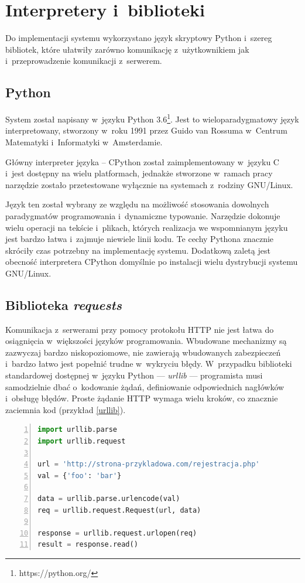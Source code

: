 \documentclass[12pt,a4paper,polish,thesis]{dcsbook}
\begin{document}
\section{Interpretery i~biblioteki}
Do implementacji systemu wykorzystano język skryptowy Python i~szereg bibliotek, które ułatwiły zarówno komunikację z~użytkownikiem jak i~przeprowadzenie komunikacji z~serwerem.

\subsection{Python}
System został napisany w~języku Python 3.6\footnote{https://python.org/}. Jest to wieloparadygmatowy język interpretowany, stworzony w~roku 1991 przez Guido van Rossuma w~Centrum Matematyki i~Informatyki w~Amsterdamie.

Główny interpreter języka -- CPython został zaimplementowany w~języku C i~jest dostępny na wielu platformach, jednakże stworzone w~ramach pracy narzędzie zostało przetestowane wyłącznie na systemach z~rodziny GNU/Linux.

Język ten został wybrany ze względu na możliwość stosowania dowolnych paradygmatów programowania i~dynamiczne typowanie. Narzędzie dokonuje wielu operacji na tekście i~plikach, których realizacja we wspomnianym języku jest bardzo łatwa i~zajmuje niewiele linii kodu. Te cechy Pythona znacznie skróciły czas potrzebny na implementację systemu. Dodatkową zaletą jest obecność interpretera CPython domyślnie po instalacji wielu dystrybucji systemu GNU/Linux.

\subsection{Biblioteka \textit{requests}}
Komunikacja z~serwerami przy pomocy protokołu HTTP nie jest łatwa do osiągnięcia w~większości języków programowania. Wbudowane mechanizmy są zazwyczaj bardzo niskopoziomowe, nie zawierają wbudowanych zabezpieczeń i~bardzo łatwo jest popełnić trudne w~wykryciu błędy. W~przypadku biblioteki standardowej dostępnej w~języku Python --- \textit{urllib} --- programista musi samodzielnie dbać o~kodowanie żądań, definiowanie odpowiednich nagłówków i~obsługę błędów. Proste żądanie HTTP wymaga wielu kroków, co znacznie zaciemnia kod (przykład \ref{urllib}).

\begin{lstlisting}[language=python,frame=single,caption=Wykorzystanie biblioteki urllib,label=urllib,numbers=left]
import urllib.parse
import urllib.request

url = 'http://strona-przykladowa.com/rejestracja.php'
val = {'foo': 'bar'}

data = urllib.parse.urlencode(val)
req = urllib.request.Request(url, data)

response = urllib.request.urlopen(req)
result = response.read()
\end{lstlisting}
\end{document}
